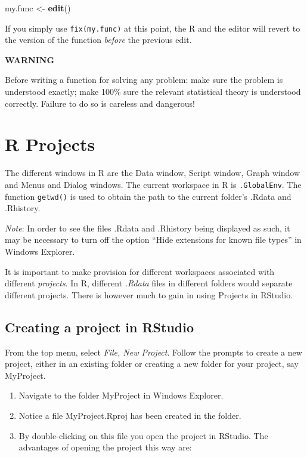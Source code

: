 \documentclass[
]{book}
\newenvironment{Shaded}{\begin{snugshade}}{\end{snugshade}}
\newcommand{\FunctionTok}[1]{\textcolor[rgb]{0.13,0.29,0.53}{\textbf{#1}}}
\newcommand{\NormalTok}[1]{#1}
\newcommand{\OtherTok}[1]{\textcolor[rgb]{0.56,0.35,0.01}{#1}}
\providecommand{\tightlist}{%
  \setlength{\itemsep}{0pt}\setlength{\parskip}{0pt}}
\begin{document}
\begin{Shaded}
\begin{Highlighting}[]
\NormalTok{my.func }\OtherTok{\textless{}{-}} \FunctionTok{edit}\NormalTok{()}
\end{Highlighting}
\end{Shaded}

If you simply use \texttt{fix(my.func)} at this point, the R and the editor will revert to the version of the function \emph{before} the previous edit.

\textbf{WARNING}

Before writing a function for solving any problem: make sure the problem is understood exactly; make 100\% sure the relevant statistical theory is understood correctly. Failure to do so is careless and dangerous!

\section{R Projects}\label{r-projects}

The different windows in R are the Data window, Script window, Graph window and Menus and Dialog windows. The current {workspace} in R is \texttt{.GlobalEnv}. The function \texttt{getwd()} is used to obtain the path to the current folder's {.Rdata} and {.Rhistory}.

\emph{Note}: In order to see the files {.Rdata} and {.Rhistory} being displayed as such, it may be necessary to turn off the option ``Hide extensions for known file types'' in Windows Explorer.

It is important to make provision for different {workspaces} associated with different \emph{{projects}}. In R, different \emph{{.Rdata}} files in different folders would separate different projects. There is however much to gain in using Projects in RStudio.

\subsection{Creating a project in RStudio}\label{creating-a-project-in-rstudio}

From the top menu, select \emph{File, New Project}. Follow the prompts to create a new project, either in an existing folder or creating a new folder for your project, say {MyProject}.

\begin{enumerate}
\def\labelenumi{(\alph{enumi})}
\tightlist
\item
  Navigate to the folder {MyProject} in Windows Explorer.
\item
  Notice a file {MyProject.Rproj} has been created in the folder.
\item
  By double-clicking on this file you open the project in RStudio. The advantages of opening the project this way are:
\end{enumerate}
\end{document}

